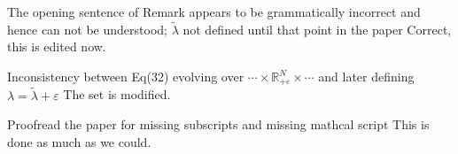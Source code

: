 \documentclass[journal,twoside,web]{ieeecolor}
\begin{document}
{\color{red}The opening sentence of Remark appears to be grammatically incorrect and hence can not be understood; $\tilde \lambda$ not defined until that point in the paper} {\color{blue} Correct, this is edited now.}

{\color{red}Inconsistency between Eq(32) evolving over $\cdots × \mathbb{R}_{+ \varepsilon}^N × \cdots$ and later defining $\lambda = \tilde \lambda + \varepsilon$} {\color{blue} The set is modified.}

{\color{red}Proofread the paper for missing subscripts and missing mathcal script} {\color{blue} This is done as much as we could.}
\end{document}

